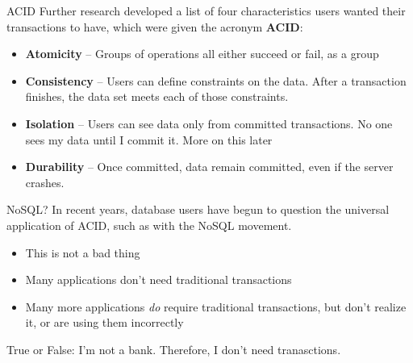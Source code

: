 \documentclass[svgnames]{beamer}
\begin{document}
\begin{frame}{ACID}
    Further research developed a list of four characteristics users wanted
    their transactions to have, which were given the acronym \textbf{ACID}:
    \begin{itemize}
        \item \textbf{Atomicity} -- Groups of operations all either succeed or
        fail, as a group
        \item \textbf{Consistency} -- Users can define constraints on the
        data. After a transaction finishes, the data set meets each of those
        constraints.
        \item \textbf{Isolation} -- Users can see data only from committed
        transactions. No one sees my data until I commit it. More on this
        later
        \item \textbf{Durability} -- Once committed, data remain committed,
        even if the server crashes.
    \end{itemize}
\end{frame}


\begin{frame}{NoSQL?}
    In recent years, database users have begun to question the universal
    application of ACID, such as with the NoSQL movement.
    \begin{itemize}
        \item This is not a bad thing
        \item Many applications don't need traditional transactions
        \item Many more applications \textit{do} require traditional
        transactions, but don't realize it, or are using them incorrectly
    \end{itemize}
\end{frame}

\begin{frame}
    True or False: I'm not a bank. Therefore, I don't need tranasctions.
\end{frame}
\end{document}
